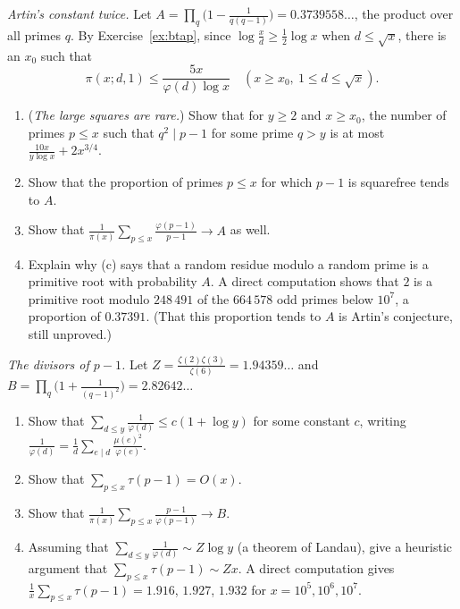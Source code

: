 \begin{exercise}[$\star\star\star$]\label{pb:pminusone}
\emph{Artin's constant twice.} Let $A=\prod_q\bigl(1-\frac1{q(q-1)}\bigr)=0.3739558\ldots$, the product over all primes $q$. By Exercise~\ref{ex:btap}, since $\log\frac xd\ge\frac12\log x$ when $d\le\sqrt x$, there is an $x_0$ such that
\begin{equation}\label{eq:bt13}
\pi(x;d,1)\le\frac{5x}{\varphi(d)\log x}\quad(x\ge x_0,\ 1\le d\le\sqrt x).
\end{equation}
\begin{enumerate}[label=(\alph*)]
\item (\emph{The large squares are rare.}) Show that for $y\ge2$ and $x\ge x_0$, the number of primes $p\le x$ such that $q^2\mid p-1$ for some prime $q>y$ is at most $\frac{10x}{y\log x}+2x^{3/4}$.
\item Show that the proportion of primes $p\le x$ for which $p-1$ is squarefree tends to $A$.
\item Show that $\frac1{\pi(x)}\sum_{p\le x}\frac{\varphi(p-1)}{p-1}\to A$ as well.
\item Explain why (c) says that a random residue modulo a random prime is a primitive root with probability $A$. A direct computation shows that $2$ is a primitive root modulo
$248\,491$ of the $664\,578$ odd primes below $10^7$, a proportion of $0.37391$. (That this proportion tends to $A$ is Artin's conjecture, still unproved.)
\end{enumerate}
\end{exercise}

\begin{exercise}[$\star\star$]\label{pb:titchmarsh}
\emph{The divisors of $p-1$.} Let $Z=\frac{\zeta(2)\zeta(3)}{\zeta(6)}=1.94359\ldots$ and $B=\prod_q\bigl(1+\frac1{(q-1)^2}\bigr)=2.82642\ldots$
\begin{enumerate}[label=(\alph*)]
\item Show that $\sum_{d\le y}\frac1{\varphi(d)}\le c(1+\log y)$ for some constant $c$, writing $\frac1{\varphi(d)}=\frac1d\sum_{e\mid d}\frac{\mu(e)^2}{\varphi(e)}$.
\item Show that $\sum_{p\le x}\tau(p-1)=O(x)$.
\item Show that $\frac1{\pi(x)}\sum_{p\le x}\frac{p-1}{\varphi(p-1)}\to B$.
\item Assuming that $\sum_{d\le y}\frac1{\varphi(d)}\sim Z\log y$ (a theorem of Landau), give a heuristic argument that $\sum_{p\le x}\tau(p-1)\sim Zx$. A direct computation gives
$\frac1x\sum_{p\le x}\tau(p-1)=1.916$, $1.927$, $1.932$ for $x=10^5,10^6,10^7$.
\end{enumerate}
\end{exercise}

